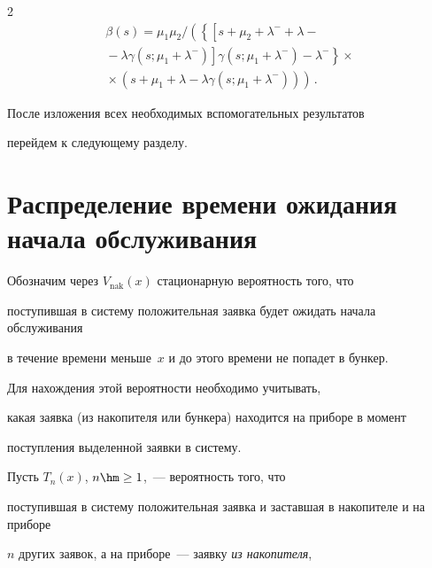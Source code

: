 \begin{multicols}{2}
\begin{multline*}
\beta (s)=  \mu_1 \mu_2 /\left(\left\{


\left[ s+\mu_2 + \lambda^- + \lambda-{}\right.\right.\right.\\


\left.\left.\left.{}-


\lambda \gamma(s;\mu_1+\lambda^-)


\right] \gamma(s;\mu_1+\lambda^-) -


\lambda^- \right\}\times{}\right.


\\


\left.{}\times


 ( s+\mu_1  + \lambda - \lambda \gamma(s; \mu_1+\lambda^-))\right)\,.


\end{multline*}





После изложения всех необходимых вспомогательных результатов


перейдем к следующему раз\-делу.





\section{Распределение времени ожидания начала обслуживания}





Обозначим через $V_{\mathrm{nak}}(x)$ стационарную вероятность того, что


поступившая в систему положительная заявка будет ожидать начала обслуживания


в течение времени меньше~$x$ и до этого времени не попадет в бункер.


Для нахождения этой вероятности необходимо учитывать,


какая заявка (из накопителя или бункера) находится на приборе в момент


поступления выделенной заявки в систему.





Пусть $T_n(x)$, $n \hm\ge 1$,~--- вероятность того, что


поступившая в систему положительная заявка и заставшая в накопителе и на приборе


$n$ других заявок, а на приборе~--- заявку \textit{из накопителя},



\end{multicols}
